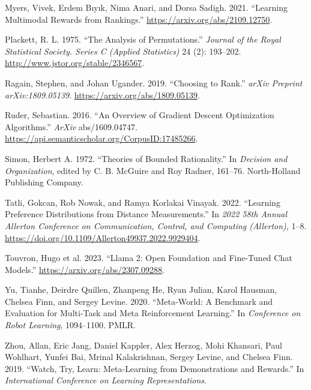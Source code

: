 \documentclass[
  letterpaper,
  numbers=noenddot,
  DIV=11]{scrreprt}
\newlength{\cslhangindent}
\newenvironment{CSLReferences}[2] %
 {\begin{list}{}{%
  \setlength{\itemindent}{0pt}
  \setlength{\leftmargin}{0pt}
  \setlength{\parsep}{0pt}
  \ifodd #1
   \setlength{\leftmargin}{\cslhangindent}
   \setlength{\itemindent}{-1\cslhangindent}
  \fi
  \setlength{\itemsep}{#2\baselineskip}}}
 {\end{list}}
\theoremstyle{plain}
\theoremstyle{definition}
\theoremstyle{remark}
\begin{document}
\begin{CSLReferences}{1}{0}
Myers, Vivek, Erdem Bıyık, Nima Anari, and Dorsa Sadigh. 2021.
{``Learning Multimodal Rewards from Rankings.''}
\url{https://arxiv.org/abs/2109.12750}.

Plackett, R. L. 1975. {``The Analysis of Permutations.''} \emph{Journal
of the Royal Statistical Society. Series C (Applied Statistics)} 24 (2):
193--202. \url{http://www.jstor.org/stable/2346567}.

Ragain, Stephen, and Johan Ugander. 2019. {``Choosing to Rank.''}
\emph{arXiv Preprint arXiv:1809.05139}.
\url{https://arxiv.org/abs/1809.05139}.

Ruder, Sebastian. 2016. {``An Overview of Gradient Descent Optimization
Algorithms.''} \emph{ArXiv} abs/1609.04747.
\url{https://api.semanticscholar.org/CorpusID:17485266}.

Simon, Herbert A. 1972. {``Theories of Bounded Rationality.''} In
\emph{Decision and Organization}, edited by C. B. McGuire and Roy
Radner, 161--76. North-Holland Publishing Company.

Tatli, Gokcan, Rob Nowak, and Ramya Korlakai Vinayak. 2022. {``Learning
Preference Distributions from Distance Measurements.''} In \emph{2022
58th Annual Allerton Conference on Communication, Control, and Computing
(Allerton)}, 1--8.
\url{https://doi.org/10.1109/Allerton49937.2022.9929404}.

Touvron, Hugo et al. 2023. {``Llama 2: Open Foundation and Fine-Tuned
Chat Models.''} \url{https://arxiv.org/abs/2307.09288}.

Yu, Tianhe, Deirdre Quillen, Zhanpeng He, Ryan Julian, Karol Hausman,
Chelsea Finn, and Sergey Levine. 2020. {``Meta-World: A Benchmark and
Evaluation for Multi-Task and Meta Reinforcement Learning.''} In
\emph{Conference on Robot Learning}, 1094--1100. PMLR.

Zhou, Allan, Eric Jang, Daniel Kappler, Alex Herzog, Mohi Khansari, Paul
Wohlhart, Yunfei Bai, Mrinal Kalakrishnan, Sergey Levine, and Chelsea
Finn. 2019. {``Watch, Try, Learn: Meta-Learning from Demonstrations and
Rewards.''} In \emph{International Conference on Learning
Representations}.

\end{CSLReferences}
\end{document}
